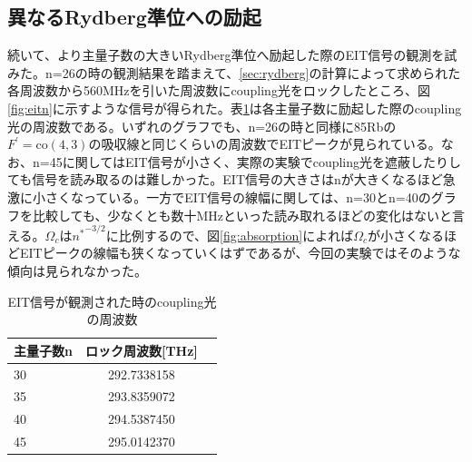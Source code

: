 \documentclass[dvipdfmx]{jsarticle}
\begin{document}
\subsection{異なるRydberg準位への励起}
続いて、より主量子数の大きいRydberg準位へ励起した際のEIT信号の観測を試みた。n=26の時の観測結果を踏まえて、\ref{sec:rydberg}の計算によって求められた各周波数から560MHzを引いた周波数にcoupling光をロックしたところ、図\ref{fig:eitn}に示すような信号が得られた。表\ref{table:eit}は各主量子数に励起した際のcoupling光の周波数である。いずれのグラフでも、n=26の時と同様に85Rbの$F^{'} = \text{co}(4,3)$の吸収線と同じくらいの周波数でEITピークが見られている。なお、n=45に関してはEIT信号が小さく、実際の実験でcoupling光を遮蔽したりしても信号を読み取るのは難しかった。EIT信号の大きさはnが大きくなるほど急激に小さくなっている。一方でEIT信号の線幅に関しては、n=30とn=40のグラフを比較しても、少なくとも数十MHzといった読み取れるほどの変化はないと言える。$\Omega_c$は${n^*}^{-3/2}$に比例するので、図\ref{fig:absorption}によれば$\Omega_c$が小さくなるほどEITピークの線幅も狭くなっていくはずであるが、今回の実験ではそのような傾向は見られなかった。
\begin{table}[hbtp]
  \caption{EIT信号が観測された時のcoupling光の周波数}
  \label{table:eit}
  \centering
  \begin{tabular}{lcr}
    \hline
    主量子数n  & ロック周波数[THz]  \\
    \hline
    30  & 292.7338158 \\
    35  & 293.8359072 \\
    40  & 294.5387450 \\
    45  & 295.0142370 \\
    \hline
  \end{tabular}
\end{table}
\end{document}
